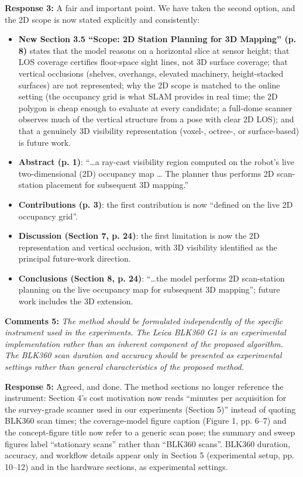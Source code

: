 \documentclass[11pt]{article}
\begin{document}
\textbf{Response 3:} A fair and important point. We have taken the second option, and the 2D scope is now stated explicitly and consistently:
\begin{itemize}
\item \textbf{New Section 3.5 “Scope: 2D Station Planning for 3D Mapping” (p. 8)} states that the model reasons on a horizontal slice at sensor height; that LOS coverage certifies floor-space sight lines, not 3D surface coverage; that vertical occlusions (shelves, overhangs, elevated machinery, height-stacked surfaces) are not represented; why the 2D scope is matched to the online setting (the occupancy grid is what SLAM provides in real time; the 2D polygon is cheap enough to evaluate at every candidate; a full-dome scanner observes much of the vertical structure from a pose with clear 2D LOS); and that a genuinely 3D visibility representation (voxel-, octree-, or surface-based) is future work.
\item \textbf{Abstract (p. 1)}: “…a ray-cast visibility region computed on the robot’s live two-dimensional (2D) occupancy map … The planner thus performs 2D scan-station placement for subsequent 3D mapping.”
\item \textbf{Contributions (p. 3)}: the first contribution is now “defined on the live 2D occupancy grid”.
\item \textbf{Discussion (Section 7, p. 24)}: the first limitation is now the 2D representation and vertical occlusion, with 3D visibility identified as the principal future-work direction.
\item \textbf{Conclusions (Section 8, p. 24)}: “…the model performs 2D scan-station planning on the live occupancy map for subsequent 3D mapping”; future work includes the 3D extension.
\end{itemize}

\medskip

\textbf{Comments 5:} \emph{The method should be formulated independently of the specific instrument used in the experiments. The Leica BLK360 G1 is an experimental implementation rather than an inherent component of the proposed algorithm. The BLK360 scan duration and accuracy should be presented as experimental settings rather than general characteristics of the proposed method.}

\textbf{Response 5:} Agreed, and done. The method sections no longer reference the instrument: Section 4’s cost motivation now reads “minutes per acquisition for the survey-grade scanner used in our experiments (Section 5)” instead of quoting BLK360 scan times; the coverage-model figure caption (Figure 1, pp. 6–7) and the concept-figure title now refer to a generic scan pose; the summary and sweep figures label “stationary scans” rather than “BLK360 scans”. BLK360 duration, accuracy, and workflow details appear only in Section 5 (experimental setup, pp. 10–12) and in the hardware sections, as experimental settings.
\end{document}

